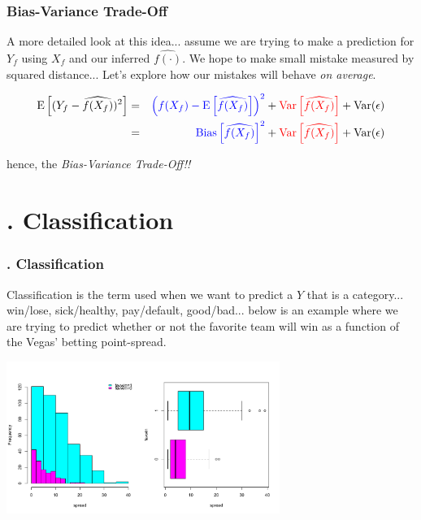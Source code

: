 \documentclass[flegn]{beamer}
\newcommand{\sko}{\vspace{.1in}}
\begin{document}
\begin{frame}
\frametitle{Bias-Variance Trade-Off}
A more detailed look at this idea... assume we are trying to make a prediction for $Y_f$ using $X_f$ and our inferred $\widehat{f(\cdot)}$. We hope to make small mistake measured by squared distance... Let's explore how our mistakes will behave {\color{red}\it on average}.

\begin{eqnarray*}
\mbox{E}\left[ (Y_f - \widehat{f(X_f)})^2\right] &=& {\color{blue}\left(f(X_f) - \mbox{E}\left[\widehat{f(X_f)}\right] \right)^2} +  {\color{red}\mbox{Var}\left[ \widehat{f(X_f)}\right]} + \mbox{Var}(\epsilon) \\
&=&  {\color{blue}\mbox{Bias}\left[\widehat{f(X_f)}\right]^2} +  {\color{red}\mbox{Var}\left[ \widehat{f(X_f)}\right]} +\mbox{Var}(\epsilon)
\end{eqnarray*}

\sko

hence, the {\it Bias-Variance Trade-Off!!}


\end{frame}



\section{. Classification}
\begin{frame}
\frametitle{. Classification}
{\color{red}Classification} is the term used when we want to predict a $Y$ that is a category... win/lose, sick/healthy, pay/default, good/bad... below is an example where we are trying to predict whether or not the favorite team will win as a function of the Vegas' betting point-spread. 

\begin{center}
\includegraphics[width=3.5in]{NBA1}
\end{center}
\end{frame}
\end{document}

